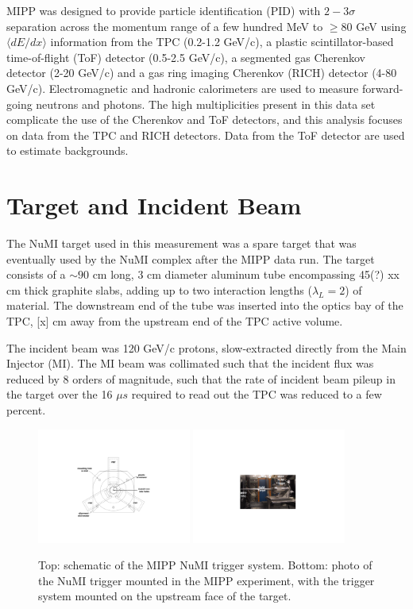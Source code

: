 \documentclass[%
aps, prd, reprint, show pacs, preprint numbers, ams math, amssymb, superscriptaddress, linenumbers]{revtex4-1}
\newcommand{\dedx}{\ensuremath{\langle dE/dx\rangle}\xspace}
\begin{document}
MIPP was designed to provide particle identification (PID) with $2-3\sigma$ separation across the momentum range of a few hundred MeV to $\ge 80$ GeV using \dedx information from the TPC (0.2-1.2 GeV/c), a plastic scintillator-based time-of-flight (ToF) detector (0.5-2.5 GeV/c), a segmented gas Cherenkov detector (2-20 GeV/c) and a gas ring imaging Cherenkov (RICH) detector (4-80 GeV/c).  Electromagnetic and hadronic calorimeters are used to measure forward-going neutrons and photons\cite{ref:MIPPNeutron}.  The high multiplicities present in this data set complicate the use of the Cherenkov and ToF detectors, and this analysis focuses on data from the TPC and RICH detectors.  Data from the ToF detector are used to estimate backgrounds.

\section{Target and Incident Beam}
The NuMI target used in this measurement was a spare target that was eventually used by the NuMI complex after the MIPP data run.  The target consists of a $\sim 90$ cm long, 3 cm diameter aluminum tube encompassing 45(?) xx cm thick graphite slabs, adding up to two interaction lengths ($\lambda_L = 2$) of material.  The downstream end of the tube was inserted into the optics bay of the TPC, [x] cm away from the upstream end of the TPC active volume.  

The incident beam was 120 GeV/c protons, slow-extracted directly from the Main Injector (MI).  The MI beam was collimated such that the incident flux was reduced by 8 orders of magnitude, such that the rate of incident beam pileup in the target over the 16 $\mu s$ required to read out the TPC was reduced to a few percent.

\begin{figure}[t]
   \centering
   \includegraphics[width=0.45\textwidth]{NuMITrigger}
   \includegraphics[width=0.45\textwidth]{NuMITargetInMIPP}
   \caption{Top: schematic of the MIPP NuMI trigger system.  Bottom: photo of the NuMI trigger mounted in the MIPP experiment, with the trigger system mounted on the upstream face of the target.}
   \label{fig:numitrigger}
\end{figure}
\end{document}
